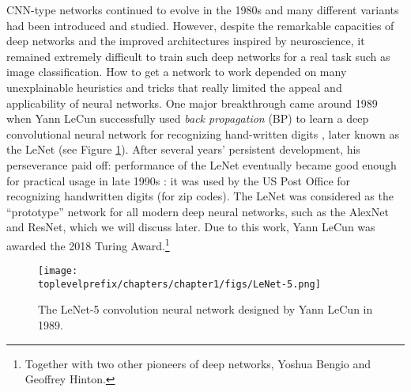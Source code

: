 \documentclass[\toplevelprefix/book-main.tex]{subfiles}
\begin{document}
CNN-type networks continued to evolve in the 1980s and many different variants had been introduced and studied. However, despite the remarkable capacities of deep networks and the improved architectures inspired by neuroscience, it remained extremely difficult to train such deep networks for a real task such as image classification. How to get a network to work depended on many unexplainable heuristics and tricks that really limited the appeal and applicability of neural networks. One major breakthrough came around 1989 when Yann LeCun successfully used {\em back propagation} (BP) to learn a deep convolutional neural network for recognizing hand-written digits \cite{LeCun-1989}, later known as the LeNet (see Figure \ref{fig:LeNet-5}). After several years' persistent development, his perseverance paid off: performance of the LeNet eventually became good enough for practical usage in late 1990s \cite{LeCun-1998}: it was used by the US Post Office for recognizing handwritten digits (for zip codes).  The LeNet was considered as the ``prototype'' network for all modern deep neural networks, such as the AlexNet and ResNet, which we will discuss later. Due to this work, Yann LeCun was awarded the 2018 Turing Award.\footnote{Together with two other pioneers of deep networks, Yoshua Bengio and Geoffrey Hinton.}

\begin{figure}
    \centering
\texttt{[image: \\toplevelprefix/chapters/chapter1/figs/LeNet-5.png]}
    \caption{The LeNet-5 convolution neural network designed by Yann LeCun in 1989. }
    \label{fig:LeNet-5}
\end{figure}
\end{document}
